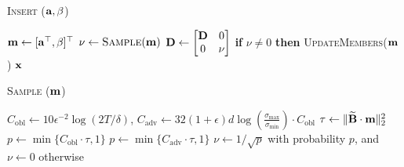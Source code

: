 \begin{algorithm}[!hbtp]
\caption{\textsc{Insert} ($\mathbf{a}, \beta$) }
\label{algo:update}
\begin{algorithmic}[1]
\State $\mathbf{m} \leftarrow [\mathbf{a}^{\top}, \beta]^{\top}$  
\State $\nu \leftarrow \textsc{Sample}(\mathbf{m})$\Comment{$\nu \in \R$}\label{line:sample_in_update}
\State $\mathbf{D} \leftarrow
\begin{bmatrix}
\mathbf{D} & 0 \\
0 & \nu
\end{bmatrix} 
$
\State \textbf{if} $\nu \neq 0$ \textbf{then} \textsc{UpdateMembers}($\mathbf{m}$)  \label{line:if_start}
\State \Return $\mathbf{x}$
\end{algorithmic}
\end{algorithm}




\begin{algorithm}[!htbp]
\caption{\textsc{Sample} ($\mathbf{m}$)}
\label{algo:sample}
\begin{algorithmic}[1]
\State $C_{\mathrm{obl}} \leftarrow 10 \epsilon^{-2} \log(2T/\delta)$, $C_{\mathrm{adv}} \leftarrow 32 (1 + \epsilon) d \log(\frac{\sigma_{\max}}{\sigma_{\min}}) \cdot C_{\mathrm{obl}}$
\State $\tau \leftarrow \|\widetilde{\mathbf{B}} \cdot \mathbf{m}\|_2^2$  \label{line:approximate-ols}
\label{line:levarage_score}
 
\State $p \leftarrow \min\{C_{\mathrm{obl}} \cdot \tau, 1\}$
\Else {}
\State $p \leftarrow \min\{C_{\mathrm{adv}} \cdot \tau, 1\}$
\EndIf 
\label{line:prob}
\State $\nu \leftarrow 1/\sqrt{p}$ with probability $p$, and $\nu \leftarrow 0$ otherwise\label{line:sample}
\end{algorithmic}
\end{algorithm}

